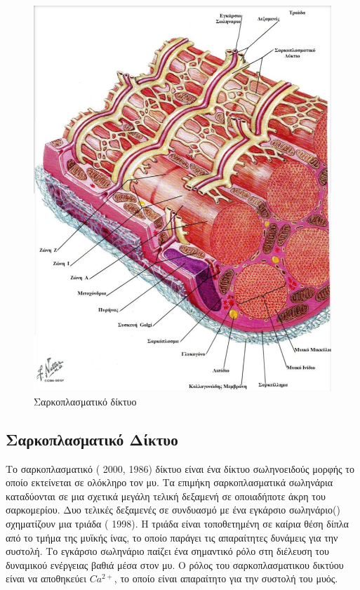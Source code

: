 \begin{figure}[H]
    \centering
    \includegraphics[width=.7\textwidth, height=0.6\textheight]{musculoskeletal/fig/muscle-fysiology3.png}
    \caption{Σαρκοπλασματικό δίκτυο\protect\footnotemark}
    \label{fig:muscle-fysiology3}
\end{figure}

\subsection{Σαρκοπλασματικό Δίκτυο}

Το σαρκοπλασματικό ( 2000,  1986) δίκτυο είναι ένα δίκτυο σωληνοειδούς μορφής το οποίο εκτείνεται σε ολόκληρο τον μυ. Τα επιμήκη σαρκοπλασματικά σωληνάρια καταδύονται σε μια σχετικά μεγάλη τελική δεξαμενή σε οποιαδήποτε άκρη του σαρκομερίου. Δυο τελικές δεξαμενές σε συνδυασμό με ένα εγκάρσιο σωληνάριο() σχηματίζουν μια τριάδα ( 1998). Η τριάδα είναι τοποθετημένη σε καίρια θέση δίπλα από το τμήμα της μυϊκής ίνας, το οποίο παράγει τις απαραίτητες δυνάμεις για την συστολή. Το εγκάρσιο σωληνάριο παίζει ένα σημαντικό ρόλο στη διέλευση του δυναμικού ενέργειας βαθιά μέσα στον μυ. Ο ρόλος του σαρκοπλασματικου δικτύου είναι να αποθηκεύει $Ca^{2+}$, το οποίο είναι απαραίτητο για την συστολή του μυός.

